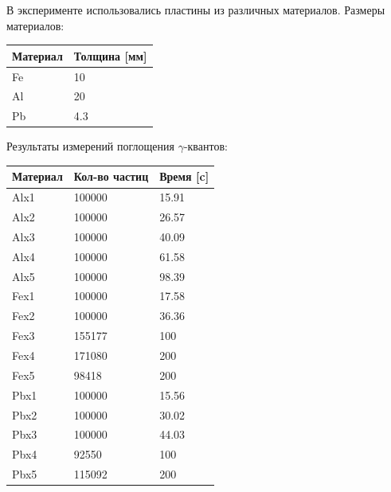\documentclass[a4paper,12pt]{article} %
\begin{document}
			В эксперименте использовались пластины из различных материалов. 
			Размеры материалов:
			\begin{table}[h!]
				\centering
				\begin{tabular}{|l|l|}
				\hline
				Материал & Толщина {[}мм{]} \\ \hline
				Fe       & 10               \\ \hline
				Al       & 20               \\ \hline
				Pb       & 4.3              \\ \hline
				\end{tabular}
			\end{table}\par
	\newpage
			Результаты измерений поглощения $\gamma$-квантов:
			\begin{table}[h!]
				\centering
				\begin{tabular}{|l|l|l|}
				\hline
				Материал & Кол-во частиц & Время {[}c{]} \\ \hline
				Alx1     & 100000        & 15.91         \\ \hline
				Alx2     & 100000        & 26.57         \\ \hline
				Alx3     & 100000        & 40.09         \\ \hline
				Alx4     & 100000        & 61.58         \\ \hline
				Alx5     & 100000        & 98.39         \\ \hline
				Fex1     & 100000        & 17.58         \\ \hline
				Fex2     & 100000        & 36.36         \\ \hline
				Fex3     & 155177        & 100           \\ \hline
				Fex4     & 171080        & 200           \\ \hline
				Fex5     & 98418         & 200           \\ \hline
				Pbx1     & 100000        & 15.56         \\ \hline
				Pbx2     & 100000        & 30.02         \\ \hline
				Pbx3     & 100000        & 44.03         \\ \hline
				Pbx4     & 92550         & 100           \\ \hline
				Pbx5     & 115092        & 200           \\ \hline
				\end{tabular}
			\end{table}\par
\end{document}
